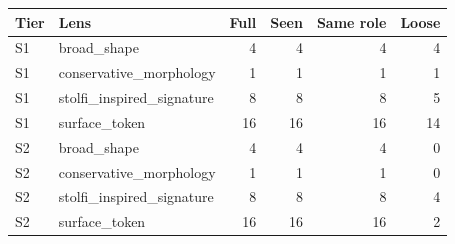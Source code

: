 {\small
\begin{tabular}{llrrrr}
\toprule
Tier & Lens & Full & Seen & Same role & Loose \\
\midrule
S1 & broad\_shape & 4 & 4 & 4 & 4 \\
S1 & conservative\_morphology & 1 & 1 & 1 & 1 \\
S1 & stolfi\_inspired\_signature & 8 & 8 & 8 & 5 \\
S1 & surface\_token & 16 & 16 & 16 & 14 \\
S2 & broad\_shape & 4 & 4 & 4 & 0 \\
S2 & conservative\_morphology & 1 & 1 & 1 & 0 \\
S2 & stolfi\_inspired\_signature & 8 & 8 & 8 & 4 \\
S2 & surface\_token & 16 & 16 & 16 & 2 \\
\bottomrule
\end{tabular}
}
